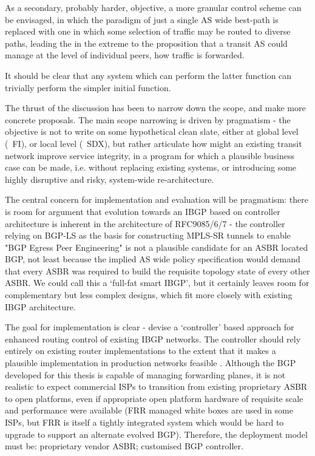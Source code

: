 As a secondary, probably harder, objective, a more granular control scheme can be envisaged, in which the paradigm of just a single AS wide best-path is replaced with one in which some selection of traffic may be routed to diverse paths, leading the in the extreme to the proposition that a transit AS could manage at the level of individual peers, how traffic is forwarded.

It should be clear that any system which can perform the latter function can trivially perform the simpler initial function.

The thrust of the discussion has been to narrow down the scope, and make more concrete proposals.  The main scope narrowing is driven by pragmatism - the objective is not to write on some hypothetical clean slate, either at global level (~FI), or local level (~SDX), but rather articulate how might an existing transit network improve service integrity, in a program for which a plausible business case can be made, i.e. without replacing existing systems, or introducing some highly disruptive and risky, system-wide re-architecture.

\bigskip

The central concern for implementation and evaluation will be pragmatism:  there is room for argument that evolution towards an IBGP based on  controller architecture is inherent in the architecture of RFC9085/6/7 - the controller relying on BGP-LS as the basis for constructing MPLS-SR tunnels to enable "BGP Egress Peer Engineering" is not a plausible candidate for an ASBR located BGP, not least because the implied AS wide policy specification would demand that every ASBR was required to build the requisite topology state of every other ASBR.   We could call this a `full-fat smart IBGP', but it certainly leaves room for complementary but less complex designs, which fit more closely with existing IBGP architecture.

\bigskip

The goal for implementation is clear - devise a `controller' based approach for enhanced routing control of existing IBGP networks.  The controller should rely entirely on existing router implementations to the extent that it makes a plausible implementation in production networks feasible .  Although the BGP developed for this thesis is capable of managing forwarding planes, it is not realistic to expect commercial ISPs to transition from existing proprietary ASBR to open platforms, even if appropriate open platform hardware of requisite scale and performance were available (FRR managed white boxes are used in some ISPs, but FRR is itself a tightly integrated system which would be hard to upgrade to support an alternate evolved BGP).  Therefore, the deployment model must be: proprietary vendor ASBR; customised BGP controller.

